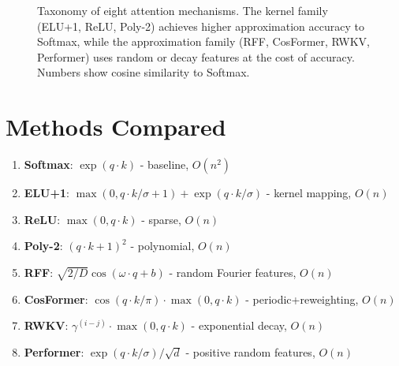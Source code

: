 \documentclass{article}
\begin{document}
\begin{figure}[t]
\caption{Taxonomy of eight attention mechanisms. The kernel family (ELU+1, ReLU, Poly-2) achieves higher approximation accuracy to Softmax, while the approximation family (RFF, CosFormer, RWKV, Performer) uses random or decay features at the cost of accuracy. Numbers show cosine similarity to Softmax.}
\label{fig:attention-taxonomy}
\end{figure}

\section{Methods Compared}

\begin{enumerate}
\item \textbf{Softmax}: $\exp(q \cdot k)$ - baseline, $O(n^2)$
\item \textbf{ELU+1}: $\max(0, q \cdot k / \sigma + 1) + \exp(q \cdot k / \sigma)$ - kernel mapping, $O(n)$
\item \textbf{ReLU}: $\max(0, q \cdot k)$ - sparse, $O(n)$
\item \textbf{Poly-2}: $(q \cdot k + 1)^2$ - polynomial, $O(n)$
\item \textbf{RFF}: $\sqrt{2/D} \cos(\omega \cdot q + b)$ - random Fourier features, $O(n)$
\item \textbf{CosFormer}: $\cos(q \cdot k / \pi) \cdot \max(0, q \cdot k)$ - periodic+reweighting, $O(n)$
\item \textbf{RWKV}: $\gamma^{(i-j)} \cdot \max(0, q \cdot k)$ - exponential decay, $O(n)$
\item \textbf{Performer}: $\exp(q \cdot k / \sigma) / \sqrt{d}$ - positive random features, $O(n)$
\end{enumerate}
\end{document}
